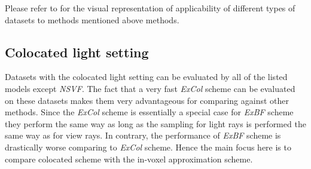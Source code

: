 

Please refer to  for the visual representation of applicability of different types of datasets to methods mentioned above methods.






\subsection{Colocated light setting}
\label{subsec:experiments_coloc}

Datasets with the colocated light setting can be evaluated by all of the listed models except \textit{NSVF}.
The fact that a very fast \textit{ExCol} scheme can be evaluated on these datasets
makes them very advantageous for comparing against other methods.
Since the \textit{ExCol} scheme is essentially a special case for \textit{ExBF} scheme
they perform the same way as long as the sampling for light rays is performed the same way as for view rays.
In contrary, the performance of \textit{ExBF} scheme is drastically worse comparing to \textit{ExCol} scheme.
Hence the main focus here is to compare colocated scheme with the in-voxel approximation scheme.





